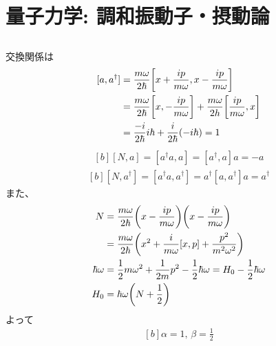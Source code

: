 \documentclass[../../sp_2018.tex]{subfiles}
\begin{document}
\setcounter{section}{0}
\section{量子力学: 調和振動子・摂動論}
\subsection{}
交換関係は
\begin{equation}\begin{aligned}[b]
    [a,a^\dagger] &= \frac{m\omega}{2\hbar}\qty[x+\frac{ip}{m\omega},x-\frac{ip}{m\omega}]\\
    &= \frac{m\omega}{2\hbar}\qty[x,-\frac{ip}{m\omega}]+\frac{m\omega}{2h}\qty[\frac{ip}{m\omega},x]\\
    &= \frac{-i}{2\hbar}i\hbar+\frac{i}{2\hbar}(-i\hbar)
    = 1
\end{aligned}\end{equation}
\begin{equation}\begin{aligned}[b]
    [N,a] = [a^\dagger a,a] = [a^\dagger,a]a = -a
\end{aligned}\end{equation}
\begin{equation}\begin{aligned}[b]
    [N,a^\dagger] = [a^\dagger a,a^\dagger] = a^\dagger[a,a^\dagger]a = a^\dagger
\end{aligned}\end{equation}
また、
\begin{equation}\begin{aligned}[b]
    N &= \frac{m\omega}{2\hbar}\qty(x-\frac{ip}{m\omega})\qty(x-\frac{ip}{m\omega})\\
    &=\frac{m\omega}{2\hbar}\qty(x^2+\frac{i}{m\omega}[x,p]+\frac{p^2}{m^2\omega^2})\\
    \hbar\omega &= \frac{1}{2}m\omega^2+\frac{1}{2m}p^2-\frac{1}{2}\hbar\omega = H_0-\frac{1}{2}\hbar\omega\\
    H_0 &= \hbar\omega\qty(N+\frac{1}{2})
\end{aligned}\end{equation}
よって
\begin{equation}\begin{aligned}[b]
    \alpha = 1,\,\beta =\frac{1}{2}
\end{aligned}\end{equation}

\subsection{}
\end{document}
